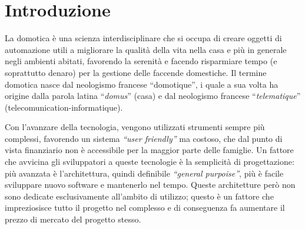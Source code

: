 \documentclass[a4paper,titlepage]{book}
\begin{document}
\begin{frontespizio}
\end{frontespizio}





\chapter*{Introduzione}
La domotica è una scienza interdisciplinare che si occupa di creare oggetti di automazione utili a migliorare la qualità della vita nella casa e più in generale negli ambienti abitati, favorendo la serenità e facendo risparmiare tempo (e soprattutto denaro) per la gestione delle faccende domestiche. Il termine domotica nasce dal neologismo francese ``domotique'', i quale a sua volta ha origine dalla parola latina ``\textit{domus}'' (casa) e dal neologismo francese ``\textit{telematique}'' (telecomunication-informatique). 
 
Con l'avanzare della tecnologia, vengono utilizzati strumenti sempre più complessi, favorendo un sistema \textit{``user friendly''} ma costoso, che dal punto di vista finanziario non è accessibile per la maggior parte delle famiglie. Un fattore che avvicina gli sviluppatori a queste tecnologie è la semplicità di progettazione: più avanzata è l'architettura, quindi definibile \textit{``general purpoise''}, più è facile sviluppare nuovo software e mantenerlo nel tempo. Queste architetture però non sono dedicate esclusivamente all'ambito di utilizzo; questo è un fattore che impreziosisce tutto il progetto nel complesso e di conseguenza fa aumentare il prezzo di mercato del progetto stesso.
\end{document}
